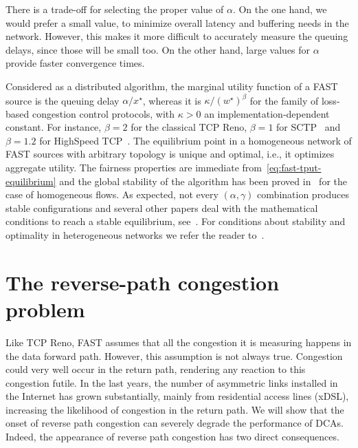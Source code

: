 \documentclass[english,times]{ettauth}
\begin{document}
There is a trade-off for selecting the proper value of $\alpha$. On the one
hand, we would prefer a small value, to minimize overall latency and buffering
needs in the network. However, this makes it more difficult to accurately
measure the queuing delays, since those will be small too. On the other hand,
large values for $\alpha$ provide faster convergence times.

Considered as a distributed algorithm, the marginal utility function of a FAST
source is the queuing delay $\alpha / x^\star$, whereas it is $\kappa /
(w^\star)^\beta$ for the family of loss-based congestion control protocols,
with $\kappa > 0$ an implementation-dependent constant. For instance, $\beta =
2$ for the classical TCP Reno, $\beta = 1$ for SCTP~\cite{Kelly03} and $\beta
= 1.2$ for HighSpeed TCP~\cite{Floyd03}. The equilibrium point in a
homogeneous network of FAST sources with arbitrary topology is unique and
optimal, i.e., it optimizes aggregate utility. The fairness properties are
immediate from~\eqref{eq:fast-tput-equilibrium} and the global stability of
the algorithm has been proved in~\cite{Choi06} for the case of homogeneous
flows. As expected, not every $(\alpha, \gamma)$ combination produces stable
configurations and several other papers deal with the mathematical conditions
to reach a stable equilibrium, see~\cite{Wang05,Choi05,Tan07}. For conditions
about stability and optimality in heterogeneous networks we refer the reader
to~\cite{Tang10}.

\section{The reverse-path congestion problem}
\label{sec:reverse-path-cong}

Like TCP Reno, FAST assumes that all the congestion it is measuring happens in
the data forward path. However, this assumption is not always true. Congestion
could very well occur in the return path, rendering any reaction to this
congestion futile. In the last years, the number of asymmetric links installed
in the Internet has grown substantially, mainly from residential access lines
(xDSL), increasing the likelihood of congestion in the return path. We will
show that the onset of reverse path congestion can severely degrade the
performance of DCAs. Indeed, the appearance of reverse path congestion has two
direct consequences.
\end{document}
